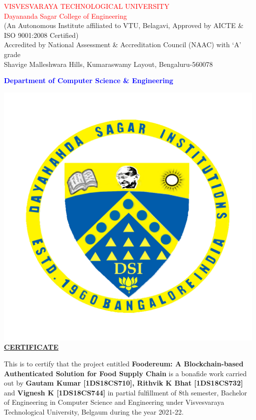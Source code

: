 \documentclass[12pt,a4paper,twocolumn,fleqn]{article}
\begin{document}
\begin{center}
\textcolor{red}{\LARGE{VISVESVARAYA TECHNOLOGICAL UNIVERSITY}} \\
\textcolor{red}{\LARGE{Dayananda Sagar College of Engineering}} \\
\footnotesize{(An Autonomous Institute affiliated to VTU, Belagavi, Approved by AICTE \& ISO 9001:2008 Certified)} \\
\footnotesize{Accredited by National Assessment \& Accreditation Council (NAAC) with ‘A’ grade}  \\
\footnotesize{Shavige Malleshwara Hills, Kumaraswamy Layout, Bengaluru-560078} \\
\begin{flushleft}
\textcolor{blue}{\LARGE{\textbf{Department of Computer Science \& Engineering}}} \\
\end{flushleft}
\includegraphics[scale=0.4]{media/DSCE-min.png} \\
\Large{\underline{\textbf{CERTIFICATE}}} \\
  \end{center}
\normalsize
This is to certify that the project entitled \textbf{Foodereum: A Blockchain-based Authenticated Solution for Food Supply Chain} is a bonafide work carried out by \textbf{Gautam Kumar [1DS18CS710], Rithvik K Bhat [1DS18CS732]} and \textbf{Vignesh K [1DS18CS744]} in partial fulfillment of 8th semester, Bachelor of Engineering in Computer Science and Engineering under Visvesvaraya Technological University, Belgaum during the year 2021-22. \\
\end{document}
